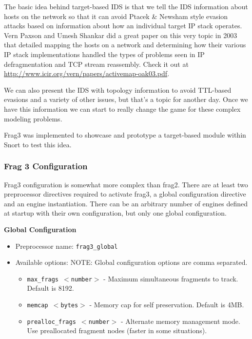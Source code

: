 \documentclass[english]{report}
\begin{document}
The basic idea behind target-based IDS is that we tell the IDS information 
about hosts on the network so that it can avoid Ptacek \& Newsham style evasion
attacks based on information about how an individual target IP stack operates.
Vern Paxson and Umesh Shankar did a great paper on this very topic in 2003 that 
detailed mapping the hosts on a network and determining how their various IP 
stack implementations handled the types of problems seen in IP defragmentation 
and TCP stream reassembly.  Check it out at \url{http://www.icir.org/vern/papers/activemap-oak03.pdf}.

We can also present the IDS with topology information to avoid TTL-based 
evasions and a variety of other issues, but that's a topic for another day.  
Once we have this information we can start to really change the game for these 
complex modeling problems.

Frag3 was implemented to showcase and prototype a target-based module within
Snort to test this idea.

\subsubsection{Frag 3 Configuration}

Frag3 configuration is somewhat more complex than frag2.  There are at least
two preprocessor directives required to activate frag3, a global configuration
directive and an engine instantiation.  There can be an arbitrary number of
engines defined at startup with their own configuration, but only one global
configuration.

\textbf{Global Configuration}
\begin{itemize}
\item Preprocessor name: \texttt{frag3\_global}
\item Available options:
  NOTE: Global configuration options are comma separated.
  \begin{itemize}
   \item     \texttt{max\_frags $<$number$>$} - Maximum simultaneous fragments to track. Default is 8192.
   \item     \texttt{memcap $<$bytes$>$} - Memory cap for self preservation.  Default is 4MB.  
   \item    \texttt{prealloc\_frags $<$number$>$} - Alternate memory management mode.  Use preallocated fragment nodes (faster in some situations).
  \end{itemize}                               
\end{itemize}    
 
\end{document}
